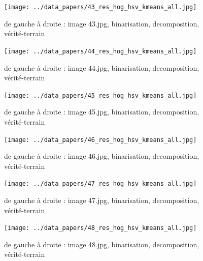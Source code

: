 \documentclass{book}
\begin{document}
\begin{figure}[H]
\begin{center}
\texttt{[image: ../data\_papers/43\_res\_hog\_hsv\_kmeans\_all.jpg]}
\end{center}
\caption{de gauche à droite : image 43.jpg, binarisation, decomposition, vérité-terrain}
\label{43}
\end{figure}
\clearpage


\begin{figure}[H]
\begin{center}
\texttt{[image: ../data\_papers/44\_res\_hog\_hsv\_kmeans\_all.jpg]}
\end{center}
\caption{de gauche à droite : image 44.jpg, binarisation, decomposition, vérité-terrain}
\label{44}
\end{figure}
\clearpage


\begin{figure}[H]
\begin{center}
\texttt{[image: ../data\_papers/45\_res\_hog\_hsv\_kmeans\_all.jpg]}
\end{center}
\caption{de gauche à droite : image 45.jpg, binarisation, decomposition, vérité-terrain}
\label{45}
\end{figure}
\clearpage


\begin{figure}[H]
\begin{center}
\texttt{[image: ../data\_papers/46\_res\_hog\_hsv\_kmeans\_all.jpg]}
\end{center}
\caption{de gauche à droite : image 46.jpg, binarisation, decomposition, vérité-terrain}
\label{46}
\end{figure}
\clearpage


\begin{figure}[H]
\begin{center}
\texttt{[image: ../data\_papers/47\_res\_hog\_hsv\_kmeans\_all.jpg]}
\end{center}
\caption{de gauche à droite : image 47.jpg, binarisation, decomposition, vérité-terrain}
\label{47}
\end{figure}
\clearpage


\begin{figure}[H]
\begin{center}
\texttt{[image: ../data\_papers/48\_res\_hog\_hsv\_kmeans\_all.jpg]}
\end{center}
\caption{de gauche à droite : image 48.jpg, binarisation, decomposition, vérité-terrain}
\label{48}
\end{figure}
\clearpage
\end{document}
